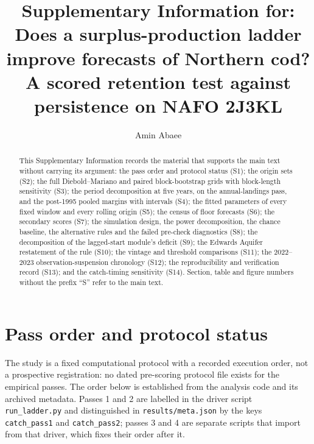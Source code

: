 \documentclass[preprint,11pt,authoryear]{elsarticle}
\theoremstyle{remark}
\begin{document}
\begin{frontmatter}
\title{Supplementary Information for:\\ Does a surplus-production ladder improve forecasts of Northern cod? A scored retention test against persistence on NAFO 2J3KL}
\author[1]{Amin Abaee}
\begin{abstract}
This Supplementary Information records the material that supports the main text without carrying its argument: the pass order and protocol status (S1); the origin sets (S2); the full Diebold--Mariano and paired block-bootstrap grids with block-length sensitivity (S3); the period decomposition at five years, on the annual-landings pass, and the post-1995 pooled margins with intervals (S4); the fitted parameters of every fixed window and every rolling origin (S5); the census of floor forecasts (S6); the secondary scores (S7); the simulation design, the power decomposition, the chance baseline, the alternative rules and the failed pre-check diagnostics (S8); the decomposition of the lagged-start module's deficit (S9); the Edwards Aquifer restatement of the rule (S10); the vintage and threshold comparisons (S11); the 2022--2023 observation-suspension chronology (S12); the reproducibility and verification record (S13); and the catch-timing sensitivity (S14). Section, table and figure numbers without the prefix ``S'' refer to the main text.
\end{abstract}
\end{frontmatter}
\section{Pass order and protocol status}\label{si:passes}

The study is a fixed computational protocol with a recorded execution order, not a prospective registration: no dated pre-scoring protocol file exists for the empirical passes. The order below is established from the analysis code and its archived metadata. Passes 1 and 2 are labelled in the driver script \texttt{run\_ladder.py} and distinguished in \texttt{results/meta.json} by the keys \texttt{catch\_pass1} and \texttt{catch\_pass2}; passes 3 and 4 are separate scripts that import from that driver, which fixes their order after it.
\end{document}
